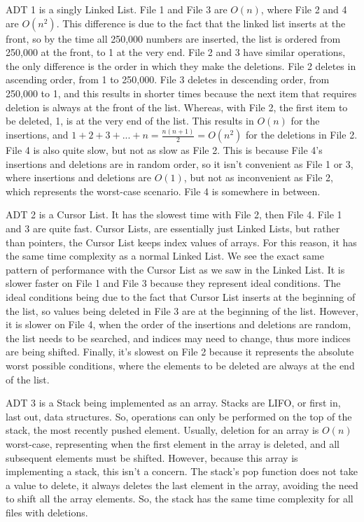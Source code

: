 \documentclass[12pt]{article}
\begin{document}
\begin{doublespace}
    ADT 1 is a singly Linked List. File 1 and File 3 are $O(n)$, where File 2 and 4 are $O(n^2)$. This difference is due to the fact that the linked list inserts at the front, so by the time all 250,000 numbers are inserted, the list is ordered from 250,000 at the front, to 1 at the very end. File 2 and 3 have similar operations, the only difference is the order in which they make the deletions. File 2 deletes in ascending order, from 1 to 250,000. File 3 deletes in descending order, from 250,000 to 1, and this results in shorter times because the next item that requires deletion is always at the front of the list. Whereas, with File 2, the first item to be deleted, 1, is at the very end of the list. This results in $O(n)$ for the insertions, and $1+2+3+...+n=\frac{n(n+1)}{2}=O(n^2)$ for the deletions in File 2. File 4 is also quite slow, but not as slow as File 2. This is because File 4's insertions and deletions are in random order, so it isn't convenient as File 1 or 3, where insertions and deletions are $O(1)$, but not as inconvenient as File 2, which represents the worst-case scenario. File 4 is somewhere in between.

    ADT 2 is a Cursor List. It has the slowest time with File 2, then File 4. File 1 and 3 are quite fast. Cursor Lists, are essentially just Linked Lists, but rather than pointers, the Cursor List keeps index values of arrays. For this reason, it has the same time complexity as a normal Linked List. We see the exact same pattern of performance with the Cursor List as we saw in the Linked List. It is slower faster on File 1 and File 3 because they represent ideal conditions. The ideal conditions being due to the fact that Cursor List inserts at the beginning of the list, so values being deleted in File 3 are at the beginning of the list. However, it is slower on File 4, when the order of the insertions and deletions are random, the list needs to be searched, and indices may need to change, thus more indices are being shifted. Finally, it's slowest on File 2 because it represents the absolute worst possible conditions, where the elements to be deleted are always at the end of the list. 

    ADT 3 is a Stack being implemented as an array. Stacks are LIFO, or first in, last out, data structures. So, operations can only be performed on the top of the stack, the most recently pushed element. Usually, deletion for an array is $O(n)$ worst-case, representing when the first element in the array is deleted, and all subsequent elements must be shifted. However, because this array is implementing a stack, this isn't a concern. The stack's pop function does not take a value to delete, it always deletes the last element in the array, avoiding the need to shift all the array elements. So, the stack has the same time complexity for all files with deletions.


\end{doublespace}
\end{document}
